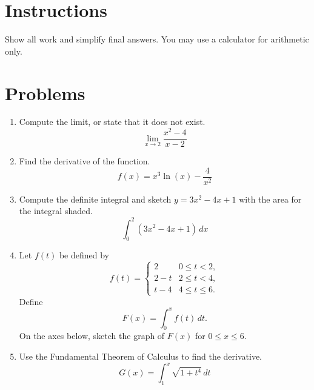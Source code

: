 \maketitle

\section*{Instructions}
Show all work and simplify final answers. You may use a calculator for arithmetic only.

\section*{Problems}
\begin{enumerate}
  \item Compute the limit, or state that it does not exist.
  \[\lim_{x \to 2} \frac{x^2 - 4}{x-2}\]
  \vspace{1.5in}

  \item Find the derivative of the function.
  \[f(x) = x^3 \ln(x) - \frac{4}{x^2}\]

  \newpage

  \item Compute the definite integral and sketch $y = 3x^2 - 4x + 1$ with the area for the integral shaded.
  \[\int_{0}^{2} (3x^2 - 4x + 1)\,dx\]

  \newpage

  \item Let $f(t)$ be defined by
  \[
    f(t) =
    \begin{cases}
      2 & 0 \le t < 2,\\
      2 - t & 2 \le t < 4,\\
      t - 4 & 4 \le t \le 6.
    \end{cases}
  \]
  Define
  \[F(x) = \int_{0}^{x} f(t)\,dt.\]
  On the axes below, sketch the graph of $F(x)$ for $0 \le x \le 6$.

  \begin{center}
  \end{center}
  \vspace{1.0in}

  \item Use the Fundamental Theorem of Calculus to find the derivative.
  \[G(x) = \int_{1}^{x} \sqrt{1 + t^4}\,dt\]
  \vspace{1.3in}
\end{enumerate}
